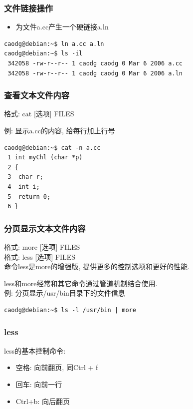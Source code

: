 \documentclass[compress]{beamer}
\begin{document}
 \begin{frame}[containsverbatim]
   \frametitle{文件链接操作}

\begin{itemize}
\item 为文件a.cc产生一个硬链接a.ln\\[1ex]
\end{itemize}

\begin{Verbatim}
caodg@debian:~$ ln a.cc a.ln
caodg@debian:~$ ls -il
 342058 -rw-r--r-- 1 caodg caodg 0 Mar 6 2006 a.cc
 342058 -rw-r--r-- 1 caodg caodg 0 Mar 6 2006 a.ln
\end{Verbatim}

\end{frame}

\begin{frame}[containsverbatim]
\frametitle{查看文本文件内容}
格式: \alert{cat} [选项] FILES

例: 显示a.cc的内容, 给每行加上行号\\[1ex]
\begin{Verbatim}
caodg@debian:~$ cat -n a.cc
 1 int myChl (char *p)
 2 {
 3	char r;
 4	int i;
 5	return 0;
 6 }
\end{Verbatim}
\end{frame}


\begin{frame}[containsverbatim]
\frametitle{分页显示文本文件内容}

格式: \alert{more} [选项] FILES \\
格式: \alert{less} [选项] FILES \\

命令\alert{less}是\alert{more}的增强版, 提供更多的控制选项和更好的性能.

\alert{less}和\alert{more}经常和其它命令通过管道机制结合使用.\\[1ex]
例: 分页显示/usr/bin目录下的文件信息\\
\begin{Verbatim}
caodg@debian:~$ ls -l /usr/bin | more
\end{Verbatim}
\end{frame}

\begin{frame}
\frametitle{less}

less的基本控制命令:
\begin{itemize}
\item 空格: 向前翻页, 同Ctrl + f
\item 回车: 向前一行
\item Ctrl+b: 向后翻页
\end{itemize}


\end{frame}
\end{document}
